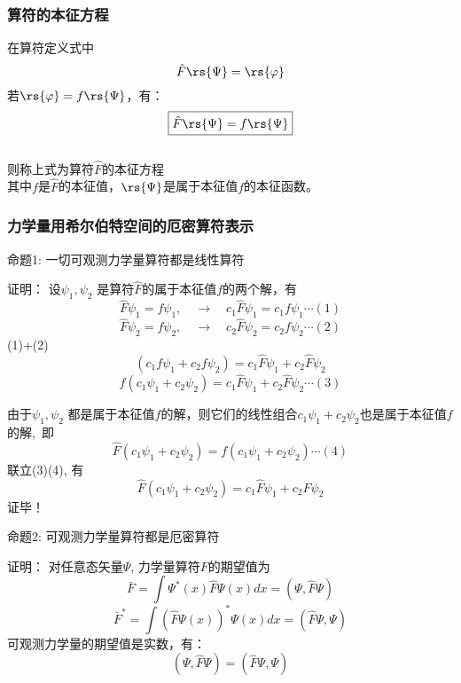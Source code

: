 \begin{frame}
    \frametitle{算符的本征方程}
    在算符定义式中
    \[\hat{F} \rs{\Psi}=\rs{\varphi}\]
    若$\rs{\varphi}=f\rs{\Psi}$，有：\\
    \[\boxed{\hat{F} \rs{\Psi}=f\rs{\Psi}}\]
    ~~\\
    则称上式为算符$\hat{F}$的本征方程\\
    其中$f$是$\hat{F}$的本征值，$\rs{\Psi}$是属于本征值$f$的本征函数。
\end{frame}

\begin{frame} 
    \frametitle{力学量用希尔伯特空间的厄密算符表示}
    \begin{atcbox}{命题1:}
      一切可观测力学量算符都是线性算符  
    \end{atcbox}
    \alert{证明：}
        设$\psi_1, \psi_2$ 是算符$\hat{F}$的属于本征值$f$的两个解，有\\
        $$\hat{F}\psi_1=f\psi_1, \quad \to \quad c_1\hat{F}\psi_1=c_1f\psi_1 \cdots (1)$$
        $$\hat{F}\psi_2=f\psi_2, \quad \to \quad c_2\hat{F}\psi_2=c_2f\psi_2 \cdots (2)$$
        (1)+(2)
        $$(c_1f\psi_1+c_2f\psi_2)=c_1\hat{F}\psi_1+c_2\hat{F}\psi_2$$
        $$f(c_1\psi_1+c_2\psi_2)=c_1\hat{F}\psi_1+c_2\hat{F}\psi_2\cdots (3)$$
\end{frame} 

\begin{frame} 
    由于$\psi_1, \psi_2$ 都是属于本征值$f$的解，则它们的线性组合$c_1\psi_1+c_2\psi_2$也是属于本征值$f$的解, 即
    $$\hat{F}(c_1\psi_1+c_2\psi_2)=f(c_1\psi_1+c_2\psi_2)\cdots (4)$$
    联立(3)(4), 有
    $$\hat{F}(c_1\psi_1+c_2\psi_2)=c_1\hat{F}\psi_1+c_2\hat{F}\psi_2$$
    证毕！
\end{frame} 

\begin{frame} 
    \begin{atcbox}{命题2:}
        可观测力学量算符都是厄密算符  
    \end{atcbox}
    \alert{证明：}
        对任意态矢量$\Psi$, 力学量算符$F$的期望值为\\
        $$\bar{F}=\int \Psi^{*}(x) \hat{F} \Psi(x) d x=(\Psi,\hat{F} \Psi) $$
        $$\bar{F}^*=\int (\hat{F} \Psi(x))^* \Psi(x) d x= (\hat{F}\Psi, \Psi) $$
        可观测力学量的期望值是实数，有：\\
        $$(\Psi,\hat{F}\Psi)=(\hat{F} \Psi, \Psi) $$
\end{frame} 

